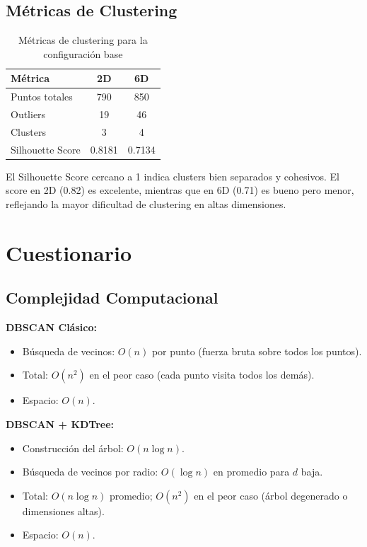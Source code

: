 \documentclass[12pt,a4paper]{article}
\begin{document}
\subsection{Métricas de Clustering}

\begin{table}[H]
\centering
\caption{Métricas de clustering para la configuración base}
\begin{tabular}{lcc}
\toprule
\textbf{Métrica} & \textbf{2D} & \textbf{6D} \\
\midrule
Puntos totales & 790 & 850 \\
Outliers & 19 & 46 \\
Clusters & 3 & 4 \\
Silhouette Score & 0.8181 & 0.7134 \\
\bottomrule
\end{tabular}
\end{table}

El Silhouette Score cercano a 1 indica clusters bien separados y cohesivos. El score en 2D (0.82) es excelente, mientras que en 6D (0.71) es bueno pero menor, reflejando la mayor dificultad de clustering en altas dimensiones.

\section{Cuestionario}

\subsection{Complejidad Computacional}

\textbf{DBSCAN Clásico:}
\begin{itemize}
    \item Búsqueda de vecinos: $O(n)$ por punto (fuerza bruta sobre todos los puntos).
    \item Total: $O(n^2)$ en el peor caso (cada punto visita todos los demás).
    \item Espacio: $O(n)$.
\end{itemize}

\textbf{DBSCAN + KDTree:}
\begin{itemize}
    \item Construcción del árbol: $O(n \log n)$.
    \item Búsqueda de vecinos por radio: $O(\log n)$ en promedio para $d$ baja.
    \item Total: $O(n \log n)$ promedio; $O(n^2)$ en el peor caso (árbol degenerado o dimensiones altas).
    \item Espacio: $O(n)$.
\end{itemize}
\end{document}
